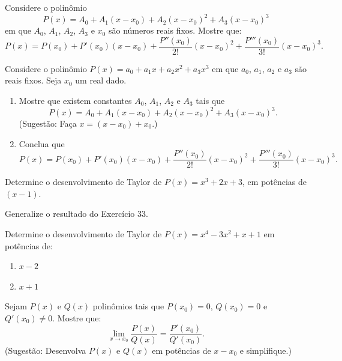 \begin{exercicio}[32]
Considere o polinômio
\[
P(x) = A_0 + A_1 (x - x_0) + A_2 (x - x_0)^2 + A_3 (x - x_0)^3
\]
em que $A_0$, $A_1$, $A_2$, $A_3$ e $x_0$ são números reais fixos. Mostre que:
\[
P(x) = P(x_0) + P'(x_0)(x - x_0) + \dfrac{P''(x_0)}{2!}(x - x_0)^2 + \dfrac{P'''(x_0)}{3!}(x - x_0)^3.
\]
\end{exercicio}

\begin{exercicio}[33]
Considere o polinômio $P(x) = a_0 + a_1 x + a_2 x^2 + a_3 x^3$ em que $a_0$, $a_1$, $a_2$ e $a_3$ são reais fixos. Seja $x_0$ um real dado.
\begin{enumerate}[label=\alph*)]
    \item Mostre que existem constantes $A_0$, $A_1$, $A_2$ e $A_3$ tais que
    \[
    P(x) = A_0 + A_1 (x - x_0) + A_2 (x - x_0)^2 + A_3 (x - x_0)^3.
    \]
    (Sugestão: Faça $x = (x - x_0) + x_0$.)
    \item Conclua que
    \[
    P(x) = P(x_0) + P'(x_0)(x - x_0) + \dfrac{P''(x_0)}{2!}(x - x_0)^2 + \dfrac{P'''(x_0)}{3!}(x - x_0)^3.
    \]
\end{enumerate}
\end{exercicio}

\begin{exercicio}[34]
Determine o desenvolvimento de Taylor de $P(x) = x^3 + 2x + 3$, em potências de $(x - 1)$.
\end{exercicio}

\begin{exercicio}[35]
Generalize o resultado do Exercício 33.
\end{exercicio}

\begin{exercicio}[36]
Determine o desenvolvimento de Taylor de $P(x) = x^4 - 3x^2 + x + 1$ em potências de:
\begin{enumerate}[label=\alph*)]
    \item $x - 2$
    \item $x + 1$
\end{enumerate}
\end{exercicio}

\begin{exercicio}[37]
Sejam $P(x)$ e $Q(x)$ polinômios tais que $P(x_0) = 0$, $Q(x_0) = 0$ e $Q'(x_0) \neq 0$. Mostre que:
\[
\lim_{x \to x_0} \dfrac{P(x)}{Q(x)} = \dfrac{P'(x_0)}{Q'(x_0)}.
\]
(Sugestão: Desenvolva $P(x)$ e $Q(x)$ em potências de $x - x_0$ e simplifique.)
\end{exercicio}


